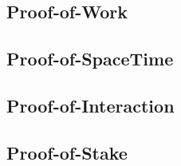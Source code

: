 \subsection{Proof-of-Work}\label{ssec:pow}
\subsection{Proof-of-SpaceTime}\label{ssec:posp}
\subsection{Proof-of-Interaction}\label{ssec:poi}
\subsection{Proof-of-Stake}\label{ssec:pos}

